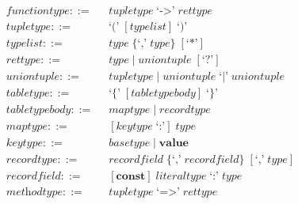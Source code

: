 \begin{align*}
\textit{functiontype} ::= & \;\; \textit{tupletype} \; \texttt{`->'} \; \textit{rettype}\\
\textit{tupletype} ::= & \;\; \texttt{`('} \; [typelist] \; \texttt{`)'}\\
\textit{typelist} ::= & \;\; \textit{type} \; \{\texttt{`,'} \; \textit{type}\} \; [\texttt{`*'}]\\
\textit{rettype} ::= & \;\; \textit{type} \; | \;
  \textit{uniontuple} \; [\texttt{`?'}]\\
\textit{uniontuple} ::= & \;\; \textit{tupletype} \; | \;
  \textit{uniontuple} \; \texttt{`|'} \; \textit{uniontuple}\\
\textit{tabletype} ::= & \;\; \texttt{`\{'} \; [\textit{tabletypebody}] \; \texttt{`\}'}\\
\textit{tabletypebody} ::= & \;\; \textit{maptype} \; | \;
  \textit{recordtype}\\
\textit{maptype} ::= & \;\; [\textit{keytype} \; \texttt{`:'}] \; \textit{type}\\
\textit{keytype} ::= & \;\; \textit{basetype} \; | \;
  \textbf{value}\\
\textit{recordtype} ::= & \;\; \textit{recordfield} \; \{\texttt{`,'} \; \textit{recordfield}\} \; [\texttt{`,'} \; \textit{type}]\\
\textit{recordfield} ::= & \;\; [\textbf{const}] \; \textit{literaltype} \; \texttt{`:'} \; \textit{type}\\
\textit{methodtype} ::= & \;\; \textit{tupletype} \; \texttt{`=>'} \; \textit{rettype}
\end{align*}
